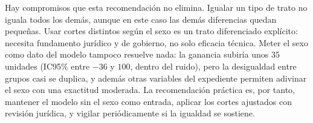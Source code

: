 Hay compromisos que esta recomendación no elimina. Igualar un tipo de trato
no iguala todos los demás, aunque en este caso las demás diferencias quedan
pequeñas. Usar cortes distintos según el sexo es un trato diferenciado
explícito: necesita fundamento jurídico y de gobierno, no solo eficacia
técnica. Meter el sexo como dato del modelo tampoco resuelve nada: la
ganancia subiría unos $35$ unidades (IC95\% entre $-36$ y $100$, dentro del
ruido), pero la desigualdad entre grupos casi se duplica, y además otras
variables del expediente permiten adivinar el sexo con una exactitud
moderada. La recomendación práctica es, por tanto, mantener el modelo sin el
sexo como entrada, aplicar los cortes ajustados con revisión jurídica, y
vigilar periódicamente si la igualdad se sostiene.


